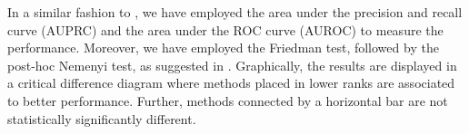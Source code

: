 \documentclass[sn-mathphys-num]{sn-jnl}%
\theoremstyle{thmstyleone}%
\theoremstyle{thmstyletwo}%
\theoremstyle{thmstylethree}%
\begin{document}
In a similar fashion to \cite{schrynemackers_protocols_2013,pliakos_global_2018,pliakos_drug-target_2020,liu_drug-target_2022}, we have employed the area under the precision and recall curve (AUPRC) and the area under the ROC curve (AUROC) to measure the performance.
%
%
% 
% 
%
Moreover, we have employed the Friedman test, followed by the post-hoc Nemenyi test, as suggested in \cite{demsar_statistical_2006}. Graphically, the results are displayed in a critical difference diagram where methods placed in lower ranks are associated to better performance. Further, methods connected by a horizontal bar are not statistically significantly different.



    
\end{document}
